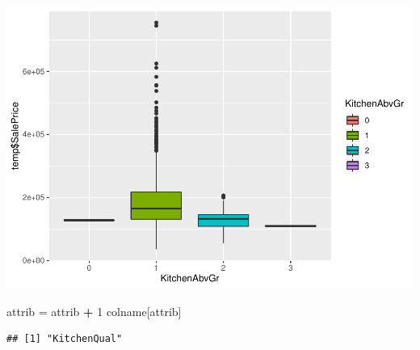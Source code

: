 \documentclass[]{article}
\newenvironment{Shaded}{\begin{snugshade}}{\end{snugshade}}
\newcommand{\DecValTok}[1]{\textcolor[rgb]{0.00,0.00,0.81}{#1}}
\newcommand{\StringTok}[1]{\textcolor[rgb]{0.31,0.60,0.02}{#1}}
\newcommand{\OperatorTok}[1]{\textcolor[rgb]{0.81,0.36,0.00}{\textbf{#1}}}
\newcommand{\NormalTok}[1]{#1}
\begin{document}
\includegraphics{EDA_files/figure-latex/unnamed-chunk-75-1.pdf}

\begin{Shaded}
\begin{Highlighting}[]
\NormalTok{attrib =}\StringTok{ }\NormalTok{attrib }\OperatorTok{+}\StringTok{ }\DecValTok{1}
\NormalTok{colname[attrib]}
\end{Highlighting}
\end{Shaded}

\begin{verbatim}
## [1] "KitchenQual"
\end{verbatim}
\end{document}
